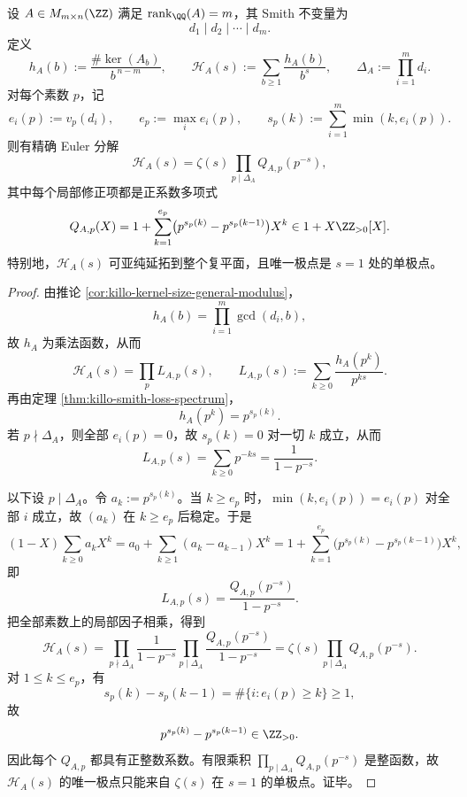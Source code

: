 \begin{theorem}\label{thm:conclusion-smith-normalized-kernel-positive-finite-euler-correction}
设 \(A\in M_{m\times n}(\ZZ)\) 满足 \(\operatorname{rank}_{\QQ}(A)=m\)，其 Smith 不变量为
\[
d_1\mid d_2\mid\cdots\mid d_m.
\]
定义
\[
h_A(b):=\frac{\#\ker(A_b)}{b^{\,n-m}},
\qquad
\mathcal H_A(s):=\sum_{b\ge 1}\frac{h_A(b)}{b^s},
\qquad
\Delta_A:=\prod_{i=1}^{m}d_i.
\]
对每个素数 \(p\)，记
\[
e_i(p):=v_p(d_i),
\qquad
e_p:=\max_i e_i(p),
\qquad
s_p(k):=\sum_{i=1}^{m}\min(k,e_i(p)).
\]
则有精确 Euler 分解
\[
\mathcal H_A(s)
=
\zeta(s)\prod_{p\mid \Delta_A}Q_{A,p}(p^{-s}),
\]
其中每个局部修正项都是正系数多项式
\[
Q_{A,p}(X)
=
1+\sum_{k=1}^{e_p}\bigl(p^{s_p(k)}-p^{s_p(k-1)}\bigr)X^k
\in 1+X\ZZ_{>0}[X].
\]
特别地，\(\mathcal H_A(s)\) 可亚纯延拓到整个复平面，且唯一极点是 \(s=1\) 处的单极点。
\end{theorem}
\begin{proof}
由推论 \ref{cor:killo-kernel-size-general-modulus}，
\[
h_A(b)=\prod_{i=1}^{m}\gcd(d_i,b),
\]
故 \(h_A\) 为乘法函数，从而
\[
\mathcal H_A(s)=\prod_p L_{A,p}(s),
\qquad
L_{A,p}(s):=\sum_{k\ge 0}\frac{h_A(p^k)}{p^{ks}}.
\]
再由定理 \ref{thm:killo-smith-loss-spectrum}，
\[
h_A(p^k)=p^{s_p(k)}.
\]
若 \(p\nmid \Delta_A\)，则全部 \(e_i(p)=0\)，故 \(s_p(k)=0\) 对一切 \(k\) 成立，从而
\[
L_{A,p}(s)=\sum_{k\ge 0}p^{-ks}=\frac{1}{1-p^{-s}}.
\]

以下设 \(p\mid\Delta_A\)。令 \(a_k:=p^{s_p(k)}\)。当 \(k\ge e_p\) 时，\(\min(k,e_i(p))=e_i(p)\) 对全部 \(i\) 成立，故 \((a_k)\) 在 \(k\ge e_p\) 后稳定。于是
\[
(1-X)\sum_{k\ge 0}a_kX^k
=
a_0+\sum_{k\ge 1}(a_k-a_{k-1})X^k
=
1+\sum_{k=1}^{e_p}\bigl(p^{s_p(k)}-p^{s_p(k-1)}\bigr)X^k,
\]
即
\[
L_{A,p}(s)=\frac{Q_{A,p}(p^{-s})}{1-p^{-s}}.
\]
把全部素数上的局部因子相乘，得到
\[
\mathcal H_A(s)
=
\prod_{p\nmid\Delta_A}\frac{1}{1-p^{-s}}
\prod_{p\mid\Delta_A}\frac{Q_{A,p}(p^{-s})}{1-p^{-s}}
=
\zeta(s)\prod_{p\mid\Delta_A}Q_{A,p}(p^{-s}).
\]
对 \(1\le k\le e_p\)，有
\[
s_p(k)-s_p(k-1)=\#\{i:e_i(p)\ge k\}\ge 1,
\]
故
\[
p^{s_p(k)}-p^{s_p(k-1)}\in\ZZ_{>0}.
\]
因此每个 \(Q_{A,p}\) 都具有正整数系数。有限乘积 \(\prod_{p\mid\Delta_A}Q_{A,p}(p^{-s})\) 是整函数，故 \(\mathcal H_A(s)\) 的唯一极点只能来自 \(\zeta(s)\) 在 \(s=1\) 的单极点。证毕。
\end{proof}

